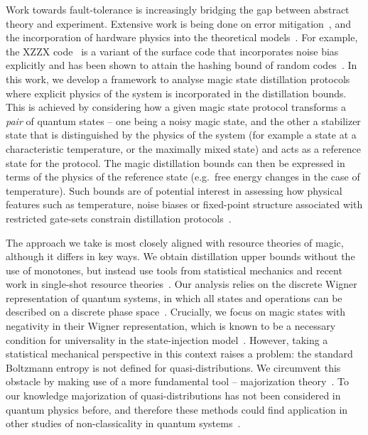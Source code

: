 \documentclass[pra,
aps,
twocolumn,
superscriptaddress,
groupedaddress,
nofootinbib,
reprint
]{revtex4-1}
\begin{document}
Work towards fault-tolerance is increasingly bridging the gap between abstract theory and experiment. Extensive work is being done on error mitigation~\cite{jones_2012, Li_2017, Temme_2017, Endo_2018, McClean_2017}, and the incorporation of hardware physics into the theoretical models~\cite{Kandala_2019, holmes_resource_2019, Colless_2018, song2018quantum, Bravyi_2021}. For example, the XZZX code~\cite{bonilla_ataides_xzzx_2021} is a variant of the surface code that incorporates noise bias explicitly and has been shown to attain the hashing bound of random codes~\cite{Bennett_1996}. In this work, we develop a framework to analyse magic state distillation protocols where explicit physics of the system is incorporated in the distillation bounds. This is achieved by considering how a given magic state protocol transforms a \emph{pair} of quantum states -- one being a noisy magic state, and the other a stabilizer state that is distinguished by the physics of the system (for example a state at a characteristic temperature, or the maximally mixed state) and acts as a reference state for the protocol. The magic distillation bounds can then be expressed in terms of the physics of the reference state (e.g.~free energy changes in the case of temperature). Such bounds are of potential interest in assessing how physical features such as temperature, noise biases or fixed-point structure associated with restricted gate-sets constrain distillation protocols~\cite{Tuckett_2019, Aliferis_2008, Stephens_2013, Li_2015, Babbush_2018, Guillaud_2019, Fowler_2019}.

The approach we take is most closely aligned with resource theories of magic, although it differs in key ways. We obtain distillation upper bounds without the use of monotones, but instead use tools from statistical mechanics and recent work in single-shot resource theories~\cite{cit:janzing, cit:horodecki2013, Brandao_2015, Vinjanampathy_2016, Goold_2016, cit:lostaglio, cit:gour}. Our analysis relies on the discrete Wigner representation of quantum systems, in which all states and operations can be described on a discrete phase space~\cite{Ferrie_2008, Okay_2021}. Crucially, we focus on magic states with negativity in their Wigner representation, which is known to be a necessary condition for universality in the state-injection model~\cite{cit:veitch, cit:mari, cit:gottesman, cit:knill, Campbell_2011}. However, taking a statistical mechanical perspective in this context raises a problem: the standard Boltzmann entropy is not defined for quasi-distributions. We circumvent this obstacle by making use of a more fundamental tool -- majorization theory~\cite{cit:marshall, Veinott_1971, Ruch_1976}. To our knowledge majorization of quasi-distributions has not been considered in quantum physics before, and therefore these methods could find application in other studies of non-classicality in quantum systems~\cite{Fine_1982, Allahverdyan_2018, arvidsson_2020, halpern_2018, Lostaglio_2018, Levy_2020}.
\end{document}
